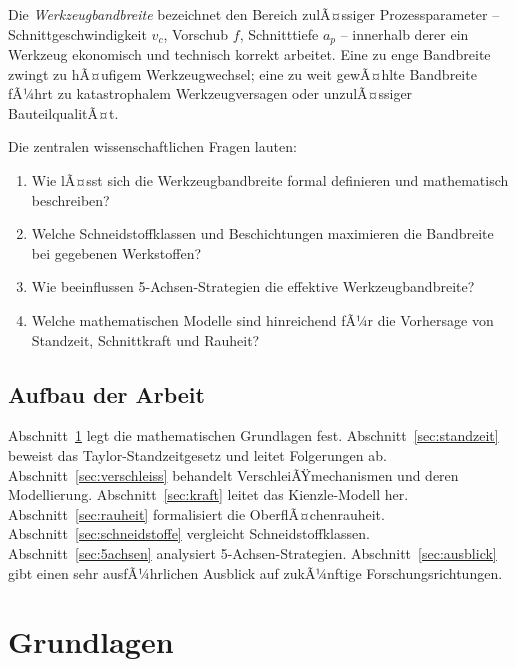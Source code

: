 ﻿\documentclass[a4paper,12pt]{article}
\theoremstyle{definition}
\begin{document}
Die \emph{Werkzeugbandbreite} bezeichnet den Bereich zulÃ¤ssiger Prozessparameter
-- Schnittgeschwindigkeit $v_c$, Vorschub $f$, Schnitttiefe $a_p$ -- innerhalb
derer ein Werkzeug ekonomisch und technisch korrekt arbeitet. Eine zu enge
Bandbreite zwingt zu hÃ¤ufigem Werkzeugwechsel; eine zu weit gewÃ¤hlte Bandbreite
fÃ¼hrt zu katastrophalem Werkzeugversagen oder unzulÃ¤ssiger BauteilqualitÃ¤t.

Die zentralen wissenschaftlichen Fragen lauten:
\begin{enumerate}
  \item Wie lÃ¤sst sich die Werkzeugbandbreite formal definieren und mathematisch
        beschreiben?
  \item Welche Schneidstoffklassen und Beschichtungen maximieren die Bandbreite
        bei gegebenen Werkstoffen?
  \item Wie beeinflussen 5-Achsen-Strategien die effektive Werkzeugbandbreite?
  \item Welche mathematischen Modelle sind hinreichend fÃ¼r die Vorhersage von
        Standzeit, Schnittkraft und Rauheit?
\end{enumerate}

\subsection{Aufbau der Arbeit}

Abschnitt~\ref{sec:grundlagen} legt die mathematischen Grundlagen fest.
Abschnitt~\ref{sec:standzeit} beweist das Taylor-Standzeitgesetz und leitet
Folgerungen ab. Abschnitt~\ref{sec:verschleiss} behandelt VerschleiÃŸmechanismen
und deren Modellierung. Abschnitt~\ref{sec:kraft} leitet das Kienzle-Modell her.
Abschnitt~\ref{sec:rauheit} formalisiert die OberflÃ¤chenrauheit. Abschnitt~\ref{sec:schneidstoffe}
vergleicht Schneidstoffklassen. Abschnitt~\ref{sec:5achsen} analysiert
5-Achsen-Strategien. Abschnitt~\ref{sec:ausblick} gibt einen sehr ausfÃ¼hrlichen
Ausblick auf zukÃ¼nftige Forschungsrichtungen.

\section{Grundlagen}
\label{sec:grundlagen}
\end{document}
